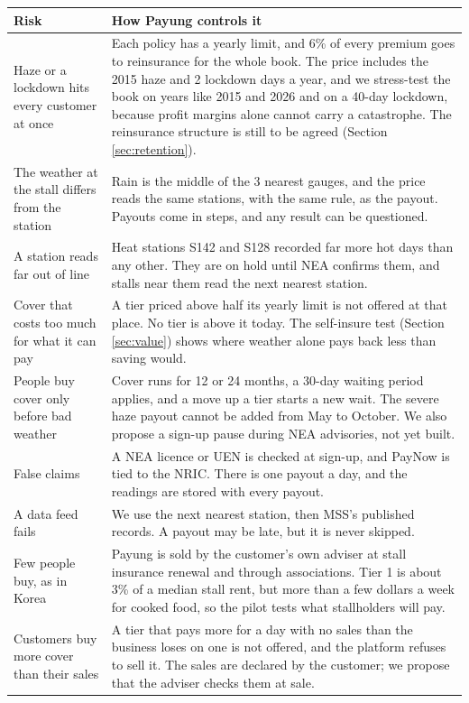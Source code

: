 \documentclass[11pt,a4paper]{article}
\newcommand{\head}{\rowcolor{soft}}
\begin{document}
{\small
\begin{xltabular}{\textwidth}{|K{4.4cm}|Y|}
\hline
\head Risk & \textbf{How Payung controls it} \\
\hline
\endhead
Haze or a lockdown hits every customer at once & Each policy has a yearly limit, and 6\% of every premium goes to reinsurance for the whole book. The price includes the 2015 haze and 2 lockdown days a year, and we stress-test the book on years like 2015 and 2026 and on a 40-day lockdown, because profit margins alone cannot carry a catastrophe.\cite{ilo} The reinsurance structure is still to be agreed (Section \ref{sec:retention}). \\
\hline
The weather at the stall differs from the station & Rain is the middle of the 3 nearest gauges, and the price reads the same stations, with the same rule, as the payout. Payouts come in steps, and any result can be questioned. \\
\hline
A station reads far out of line & Heat stations S142 and S128 recorded far more hot days than any other. They are on hold until NEA confirms them, and stalls near them read the next nearest station. \\
\hline
Cover that costs too much for what it can pay & A tier priced above half its yearly limit is not offered at that place. No tier is above it today. The self-insure test (Section \ref{sec:value}) shows where weather alone pays back less than saving would. \\
\hline
People buy cover only before bad weather & Cover runs for 12 or 24 months, a 30-day waiting period applies, and a move up a tier starts a new wait. The severe haze payout cannot be added from May to October. We also propose a sign-up pause during NEA advisories, not yet built. \\
\hline
False claims & A NEA licence or UEN is checked at sign-up, and PayNow is tied to the NRIC. There is one payout a day, and the readings are stored with every payout. \\
\hline
A data feed fails & We use the next nearest station, then MSS's published records. A payout may be late, but it is never skipped. \\
\hline
Few people buy, as in Korea & Payung is sold by the customer's own adviser at stall insurance renewal and through associations. Tier 1 is about 3\% of a median stall rent, but more than a few dollars a week for cooked food, so the pilot tests what stallholders will pay. \\
\hline
Customers buy more cover than their sales & A tier that pays more for a day with no sales than the business loses on one is not offered, and the platform refuses to sell it. The sales are declared by the customer; we propose that the adviser checks them at sale. \\
\hline
\end{xltabular}}
\end{document}
